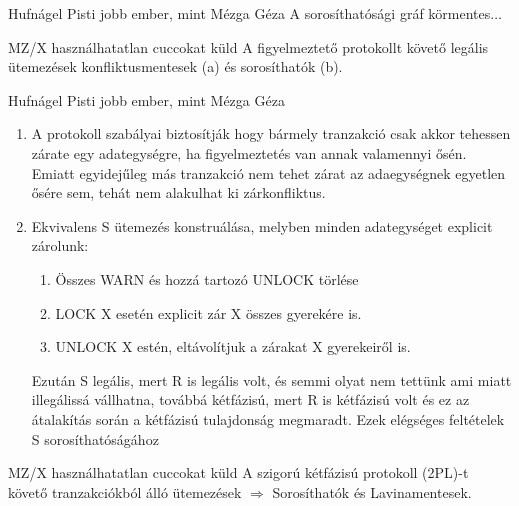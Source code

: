   \begin{bizonyitas}{Hufnágel Pisti jobb ember, mint Mézga Géza} A sorosíthatósági gráf körmentes$\ldots$
\end{bizonyitas}
\begin{tetel}{MZ/X használhatatlan cuccokat küld} A figyelmeztető protokollt követő legális ütemezések konfliktusmentesek (a) és sorosíthatók (b).
\end{tetel}

  \begin{bizonyitas}{Hufnágel Pisti jobb ember, mint Mézga Géza}

  \begin{enumerate}
    \item A protokoll szabályai biztosítják hogy bármely tranzakció csak akkor tehessen zárate egy adategységre, ha figyelmeztetés van annak valamennyi ősén. Emiatt egyidejűleg más tranzakció nem tehet zárat az adaegységnek egyetlen ősére sem, tehát nem alakulhat ki zárkonfliktus.

    \item Ekvivalens S ütemezés konstruálása, melyben minden adategységet explicit zárolunk:
      \begin{enumerate}
        \item Összes WARN és hozzá tartozó UNLOCK törlése
        \item LOCK X esetén explicit zár X összes gyerekére is.
        \item UNLOCK X estén, eltávolítjuk a zárakat X gyerekeiről is.
      \end{enumerate}

      Ezután S legális, mert R is legális volt, és semmi olyat nem tettünk ami miatt illegálissá vállhatna, továbbá kétfázisú, mert R is kétfázisú volt és ez az átalakítás során a kétfázisú tulajdonság megmaradt. Ezek elégséges feltételek S sorosíthatóságához
  \end{enumerate}
\end{bizonyitas}
\begin{tetel}{MZ/X használhatatlan cuccokat küld} A szigorú kétfázisú protokoll (2PL)-t követő tranzakciókból álló ütemezések  $\Longrightarrow$ Sorosíthatók és Lavinamentesek.
\end{tetel}

